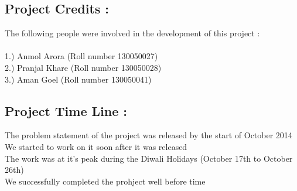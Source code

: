 \documentclass{article}
\begin{document}
\subsection*{Project Credits : }
\hspace*{5 mm}The following people were involved in the development of this project : \\
\\
\hspace*{10 mm}1.) Anmol Arora (Roll number 130050027) \\
\hspace*{10 mm}2.) Pranjal Khare (Roll number 130050028) \\
\hspace*{10 mm}3.) Aman Goel (Roll number 130050041) \\
\subsection*{Project Time Line : }
\hspace*{5 mm}The problem statement of the project was released by the start of October 2014 \\
\hspace*{5 mm}We started to work on it soon after it was released \\
\hspace*{5 mm}The work was at it's peak during the Diwali Holidays (October 17th to October 26th) \\
\hspace*{5 mm}We successfully completed the prohject well before time \\
\end{document}
